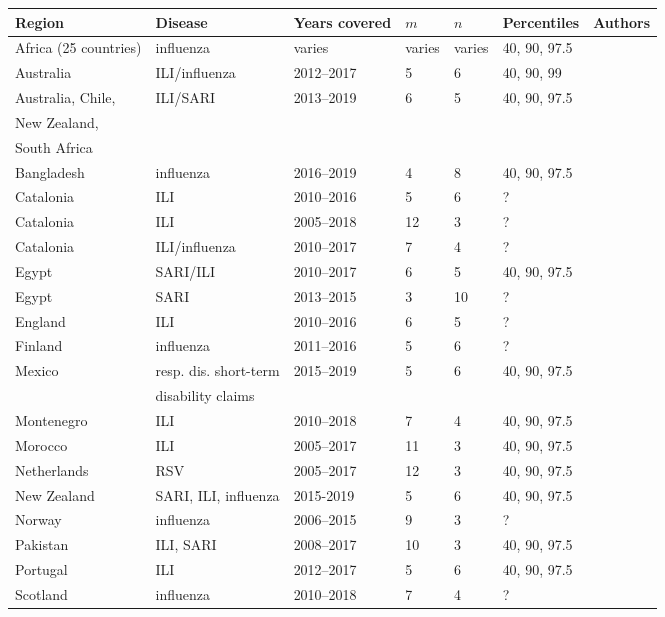 \documentclass{article}
\begin{document}
\begin{table}[h!]
\begin{tabular}{l l l l l l l}
\toprule
Region & Disease & Years covered & $m$ & $n$ & Percentiles & Authors\\
\midrule
Africa (25 countries) & influenza & varies & varies & varies & 40, 90, 97.5 & \cite{Igboh2021} \\
Australia & ILI/influenza & 2012--2017 & 5 & 6 & 40, 90, 99 & \cite{Vette2018}\\
Australia, Chile, & ILI/SARI & 2013--2019 & 6 & 5 & 40, 90, 97.5 & \cite{Sullivan2019}\\
New Zealand,\\
South Africa\\
Bangladesh & influenza & 2016--2019 & 4 & 8 & 40, 90, 97.5 & \cite{AbaOud2021}\\
Catalonia & ILI & 2010--2016 & 5 & 6 & ? & \cite{Basile2018}\\
Catalonia & ILI & 2005--2018 & 12 & 3 & ? & \cite{Basile2019}\\
Catalonia & ILI/influenza & 2010--2017 & 7 & 4 & ? & \cite{Torner2019}\\
Egypt & SARI/ILI & 2010--2017 & 6 & 5 & 40, 90, 97.5 & \cite{AbdElGawad2020}\\
Egypt & SARI & 2013--2015 & 3 & 10 & ? & \cite{Elhakim2019}\\
England & ILI & 2010--2016 & 6 & 5 & ? & \cite{Wagner2018}\\
Finland & influenza & 2011--2016 & 5 & 6 & ? & \cite{Pesaelae2019}\\
Mexico & resp. dis. short-term& 2015--2019 & 5 & 6 & 40, 90, 97.5 & \cite{HernandezAvila2022}\\
& disability claims\\
Montenegro & ILI & 2010--2018 & 7 & 4 & 40, 90, 97.5 & \cite{Rakocevic2019}\\
Morocco & ILI & 2005--2017 & 11 & 3 & 40, 90, 97.5 & \cite{Rguig2020}\\
Netherlands & RSV & 2005--2017 & 12 & 3 & 40, 90, 97.5 & \cite{Vos2019}\\
New Zealand & SARI, ILI, influenza & 2015-2019 & 5 & 6 & 40, 90, 97.5 & \cite{Wood2021}\\
Norway & influenza & 2006--2015 & 9 & 3 & ? & \cite{Benedetti2019}\\
Pakistan & ILI, SARI & 2008--2017 & 10 & 3 & 40, 90, 97.5 & \cite{Nisar2020}\\
Portugal & ILI & 2012--2017 & 5 & 6 & 40, 90, 97.5 & \cite{Pascoa2018}\\
Scotland & influenza & 2010--2018 & 7 & 4 & ? & \cite{Murray2018}\\

\end{tabular}
\end{table}
\end{document}
